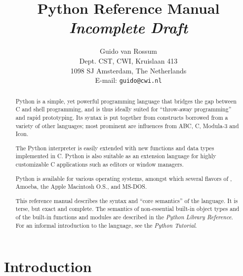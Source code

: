 

\title{\bf
	Python Reference Manual \\
	{\em Incomplete Draft}
}
	
\author{
	Guido van Rossum \\
	Dept. CST, CWI, Kruislaan 413 \\
	1098 SJ Amsterdam, The Netherlands \\
	E-mail: {\tt guido@cwi.nl}
}




\maketitle

\begin{abstract}

\noindent
Python is a simple, yet powerful programming language that bridges the
gap between C and shell programming, and is thus ideally suited for
``throw-away programming''
and rapid prototyping.  Its syntax is put
together from constructs borrowed from a variety of other languages;
most prominent are influences from ABC, C, Modula-3 and Icon.

The Python interpreter is easily extended with new functions and data
types implemented in C.  Python is also suitable as an extension
language for highly customizable C applications such as editors or
window managers.

Python is available for various operating systems, amongst which
several flavors of {\UNIX}, Amoeba, the Apple Macintosh O.S.,
and MS-DOS.

This reference manual describes the syntax and ``core semantics'' of
the language.  It is terse, but exact and complete.  The semantics of
non-essential built-in object types and of the built-in functions and
modules are described in the {\em Python Library Reference}.  For an
informal introduction to the language, see the {\em Python Tutorial}.

\end{abstract}

\pagebreak

\tableofcontents

\pagebreak


\chapter{Introduction}

